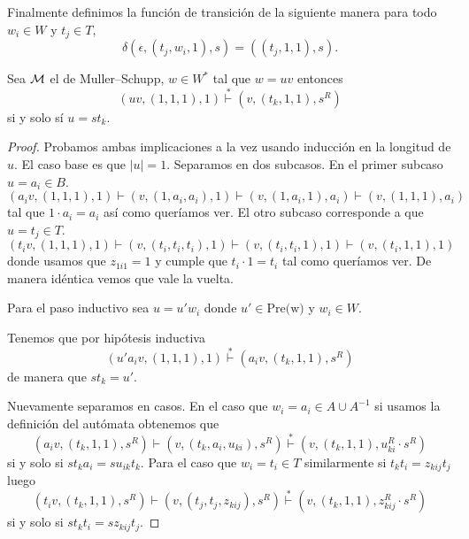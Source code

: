 \documentclass[tesis.tex]{subfiles}
\begin{document}
	Finalmente definimos la función de transición de la siguiente manera para todo $w_{i} \in W$ y $t_{j} \in T$,
	\[
		\delta(\epsilon, (t_{j},w_{i},1), s) = ((t_{j},1,1),s).
	\]

	
%		
	
	
	\begin{lema}\label{lema_MuSc_invariante}
	Sea $\cal M$ el \APD de Muller--Schupp, $w \in W^*$ tal que $ w = uv $ entonces  
		\[
			(uv,(1,1,1), 1) \overset{*}{\vdash} (v, (t_{k},1,1), s^R)
		\]
		si y solo sí $u = st_{k}$.
	\end{lema}
	
	\begin{proof}
		Probamos ambas implicaciones a la vez usando inducción en la longitud de $u$.
		El caso base es que $|u| = 1$.
		Separamos en dos subcasos. 
		En el primer subcaso $u = a_{i} \in B$.
		\[
		(a_{i}v, ( 1,1,1), 1 ) \vdash (v, (1,a_{i},a_{i}),1) \vdash (v,(1,a_{i},1),a_{i}) \vdash (v, (1,1,1), a_{i})
		\]
		tal que $1 \cdot a_{i} = a_{i}$ así como queríamos ver.
		El otro subcaso corresponde a que $u = t_{j} \in T$.
		\[
		(t_{i}v, (1,1,1), 1) \vdash (v, (t_{i},t_{i},t_{i}),1) \vdash (v,(t_{i},t_{i},1),1) \vdash (v, (t_{i},1,1), 1)
		\]
		donde usamos que $z_{1i1} = 1$ y cumple que $t_{i} \cdot 1 = t_{i}$ tal como queríamos ver.
		De manera idéntica vemos que vale la vuelta.
		
		Para el paso inductivo sea $u = u'w_{i}$ donde $u' \in \text{Pre(w)}$ y $w_{i} \in W$.

		Tenemos que por hipótesis inductiva
		\[
		(u'a_{i}v, ( 1,1,1), 1 ) \overset{*}{\vdash} (a_{i}v, (t_{k},1,1), s^R)
		\]
		de manera que $st_{k} = u'$.
		
		Nuevamente separamos en casos.
		En el caso que $w_{i} = a_{i} \in A \cup A^{-1}$	
		si usamos la definición del autómata obtenemos que  
		\[
			(a_{i}v, (t_{k},1,1), s^R) {\vdash} 
			(v, (t_{k},a_{i},u_{ki}), s^R ) \overset{*}{\vdash }
			(v, (t_{k}, 1,1), u_{ki}^R \cdot s^R)
		\]
		si y solo si $st_{k}a_{i} = su_{ik}t_{k}$.
		Para el caso que $w_{i} = t_{i} \in T$ similarmente si $t_{k}t_{i} = z_{kij} t_{j}$ luego
		\[
		(t_{i}v, (t_{k},1,1), s^R) {\vdash} 
		(v, (t_{j},t_{j},z_{kij}), s^R ) \overset{*}{\vdash }
		(v, (t_{k}, 1,1), z_{kij}^R \cdot s^R)
		\]
		si y solo si $st_{k}t_{i} = sz_{kij}t_{j}$.
	\end{proof}
	
\end{document}
